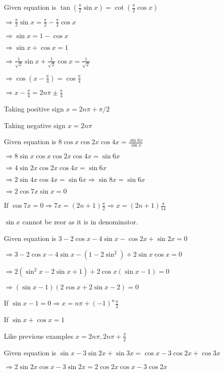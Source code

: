 \item Given equation is $\tan\left(\frac{\pi}{2}\sin x\right) = \cot\left(\frac{\pi}{2}\cos x\right)$

  $\Rightarrow \frac{\pi}{2}\sin x = \frac{\pi}{2} - \frac{\pi}{2}\cos x$

  $\Rightarrow \sin x = 1 - \cos x$

  $\Rightarrow \sin x + \cos x = 1$

  $\Rightarrow \frac{1}{\sqrt{2}}\sin x + \frac{1}{\sqrt{2}}\cos x = \frac{1}{\sqrt{2}}$

  $\Rightarrow \cos(x - \frac{\pi}{4}) = \cos \frac{\pi}{4}$

  $\Rightarrow x - \frac{\pi}{4} = 2n\pi \pm \frac{\pi}{4}$

  Taking positive sign $x = 2n\pi + \pi/2$

  Taking negative sign $x = 2n\pi$

\item Given equation is $8\cos x\cos2x\cos4x = \frac{\sin6x}{\sin x}$

  $\Rightarrow 8\sin x\cos x\cos2x\cos4x = \sin6x$

  $\Rightarrow 4\sin2x\cos2x\cos4x = \sin6x$

  $\Rightarrow 2\sin4x\cos4x = \sin6x \Rightarrow \sin8x = \sin6x$

  $\Rightarrow 2\cos7x\sin x = 0$

  If $\cos7x = 0 \Rightarrow 7x = (2n + 1)\frac{\pi}{2}\Rightarrow x = (2n + 1)\frac{\pi}{14}$

  $\sin x$ cannot be zeor as it is in denominator.

\item Given equation is $3 - 2\cos x - 4\sin x -\cos 2x + \sin 2x = 0$

  $\Rightarrow 3 - 2\cos x - 4\sin x -(1 - 2\sin^2) + 2\sin x\cos x = 0$

  $\Rightarrow 2(\sin^2x - 2\sin x + 1) + 2\cos x(\sin x -1) = 0$

  $\Rightarrow (\sin x- 1)(2\cos x + 2\sin x - 2) = 0$

  If $\sin x - 1 = 0 \Rightarrow x = n\pi + (-1)^n\frac{\pi}{2}$

  If $\sin x + \cos x = 1$

  Like previous examples $x = 2n\pi, 2n\pi + \frac{\pi}{2}$

\item Given equation is $\sin x - 3\sin 2x + \sin 3x = \cos x - 3\cos 2x + \cos 3x$

  $\Rightarrow 2\sin2x\cos x - 3\sin 2x = 2\cos2x\cos x - 3\cos 2x$

